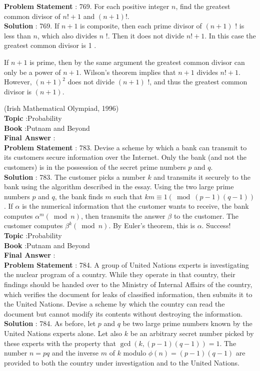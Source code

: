\documentclass[10pt]{article}
\begin{document}
\textbf{Problem Statement} :
769. For each positive integer $n$, find the greatest common divisor of $n !+1$ and $(n+1) !$.
\\
\textbf{Solution} :
769. If $n+1$ is composite, then each prime divisor of $(n+1)$ ! is less than $n$, which also divides $n$ !. Then it does not divide $n !+1$. In this case the greatest common divisor is 1 .

If $n+1$ is prime, then by the same argument the greatest common divisor can only be a power of $n+1$. Wilson's theorem implies that $n+1$ divides $n !+1$. However, $(n+1)^{2}$ does not divide $(n+1)$ !, and thus the greatest common divisor is $(n+1)$.

(Irish Mathematical Olympiad, 1996)
\\
\textbf{Topic} :Probability\\
\textbf{Book} :Putnam and Beyond\\
\textbf{Final Answer} :\\


\textbf{Problem Statement} :
783. Devise a scheme by which a bank can transmit to its customers secure information over the Internet. Only the bank (and not the customers) is in the possession of the secret prime numbers $p$ and $q$.
\\
\textbf{Solution} :
783. The customer picks a number $k$ and transmits it securely to the bank using the algorithm described in the essay. Using the two large prime numbers $p$ and $q$, the bank finds $m$ such that $k m \equiv 1(\bmod (p-1)(q-1))$. If $\alpha$ is the numerical information that the customer wants to receive, the bank computes $\alpha^{m}(\bmod n)$, then transmits the answer $\beta$ to the customer. The customer computes $\beta^{k}(\bmod n)$. By Euler's theorem, this is $\alpha$. Success!
\\
\textbf{Topic} :Probability\\
\textbf{Book} :Putnam and Beyond\\
\textbf{Final Answer} :\\


\textbf{Problem Statement} :
784. A group of United Nations experts is investigating the nuclear program of a country. While they operate in that country, their findings should be handed over to the Ministry of Internal Affairs of the country, which verifies the document for leaks of classified information, then submits it to the United Nations. Devise a scheme by which the country can read the document but cannot modify its contents without destroying the information.
\textbf{Solution} :
784. As before, let $p$ and $q$ be two large prime numbers known by the United Nations experts alone. Let also $k$ be an arbitrary secret number picked by these experts with the property that $\operatorname{gcd}(k,(p-1)(q-1))=1$. The number $n=p q$ and the inverse $m$ of $k$ modulo $\phi(n)=(p-1)(q-1)$ are provided to both the country under investigation and to the United Nations.
\end{document}

